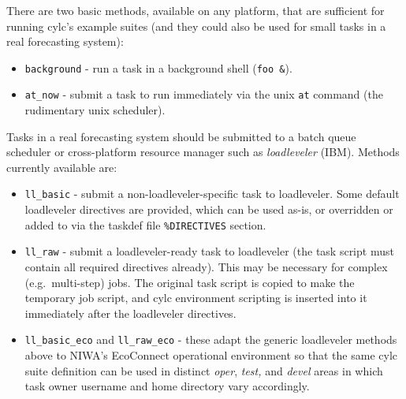 \documentclass[11pt,a4paper]{article}
\begin{document}
\lstset{language=bash}

There are two basic methods, available on any platform, that are
sufficient for running cylc's example suites (and they could also be
used for small tasks in a real forecasting system): 

\begin{itemize}

    \item \lstinline=background= - run a task in a background shell
        (\lstinline=foo &=). 

     \item \lstinline=at_now= - submit a task to run immediately via the
         unix \lstinline=at= command (the rudimentary unix scheduler).

\end{itemize}

Tasks in a real forecasting system should be submitted to a batch queue
scheduler or cross-platform resource manager such as {\em loadleveler}
(IBM). Methods currently available are:

\lstset{language=cylctaskdef}

\begin{itemize} 
    
    \item \lstinline=ll_basic= - submit a non-loadleveler-specific task
        to loadleveler. Some default loadleveler directives are
        provided, which can be used as-is, or overridden or added to
        via the taskdef file \lstinline=%DIRECTIVES= section.

    \item \lstinline=ll_raw= - submit a loadleveler-ready task to loadleveler (the task 
        script must contain all required directives already). This may be necessary for
        complex (e.g.\ multi-step) jobs. The original task script is copied to
        make the temporary job script, and cylc environment
        scripting is inserted into it immediately after the loadleveler directives.

    \item \lstinline=ll_basic_eco= and \lstinline=ll_raw_eco= - these
        adapt the generic loadleveler methods above to NIWA's EcoConnect
        operational environment so that the same cylc suite definition
        can be used in distinct {\em oper}, {\em test,} and {\em devel}
        areas in which task owner username and home directory vary
        accordingly.

\end{itemize}
\end{document}
